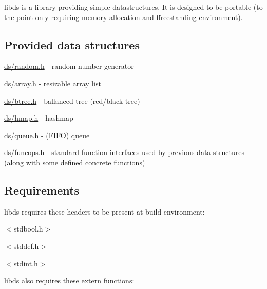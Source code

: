 {\ttfamily libds} is a library providing simple datastructures. It is designed to be portable (to the point only requiring memory allocation and ffreestanding environment).

\subsection*{Provided data structures}


\begin{DoxyItemize}
\item {\ttfamily \hyperlink{random_8h}{ds/random.\+h}} -\/ random number generator
\item {\ttfamily \hyperlink{array_8h}{ds/array.\+h}} -\/ resizable array list
\item {\ttfamily \hyperlink{btree_8h}{ds/btree.\+h}} -\/ ballanced tree (red/black tree)
\item {\ttfamily \hyperlink{hmap_8h}{ds/hmap.\+h}} -\/ hashmap
\item {\ttfamily \hyperlink{queue_8h}{ds/queue.\+h}} -\/ (F\+I\+F\+O) queue
\item {\ttfamily \hyperlink{funcops_8h}{ds/funcops.\+h}} -\/ standard function interfaces used by previous data structures (along with some defined concrete functions)
\end{DoxyItemize}

\subsection*{Requirements}

{\ttfamily libds} requires these headers to be present at build environment\+:


\begin{DoxyItemize}
\item {\ttfamily $<$stdbool.\+h$>$}
\item {\ttfamily $<$stddef.\+h$>$}
\item {\ttfamily $<$stdint.\+h$>$}
\end{DoxyItemize}

{\ttfamily libds} also requires these extern functions\+:


